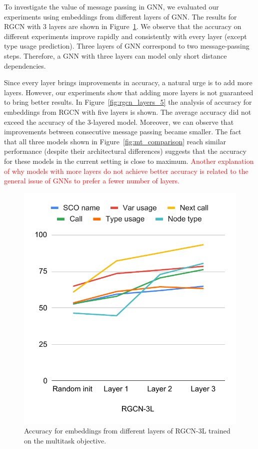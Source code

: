 \documentclass[a4paper,twoside]{article}
\begin{document}
To investigate the value of message passing in GNN, we evaluated our experiments using embeddings from different layers of GNN\@. The results for RGCN with 3 layers are shown in Figure~\ref{fig:rgcn_layers_3}. We observe that the accuracy on different experiments improve rapidly and consistently with every layer (except type usage prediction). Three layers of GNN correspond to two message-passing steps. Therefore, a GNN with three layers can model only short distance dependencies.

Since every layer brings improvements in accuracy, a natural urge is to add more layers. However, our experiments show that adding more layers is not guaranteed to bring better results. In Figure~\ref{fig:rgcn_layers_5} the analysis of accuracy for embeddings from RGCN with five layers is shown. The average accuracy did not exceed the accuracy of the 3-layered model. Moreover, we can observe that improvements between consecutive message passing became smaller. The fact that all three models shown in Figure~\ref{fig:mt_comparison} reach similar performance (despite their architectural differences) suggests that the accuracy for these models in the current setting is close to maximum. \textcolor{red}{Another explanation of why models with more layers do not achieve better accuracy is related to the general issue of GNNs to prefer a fewer number of layers.}

\begin{figure}[]
    \centering
    \includegraphics[width=\columnwidth]{rgcn-3l.pdf}
    \caption{Accuracy for embeddings from different layers of RGCN-3L trained on the multitask objective.}\label{fig:rgcn_layers_3}
\end{figure}
\end{document}
